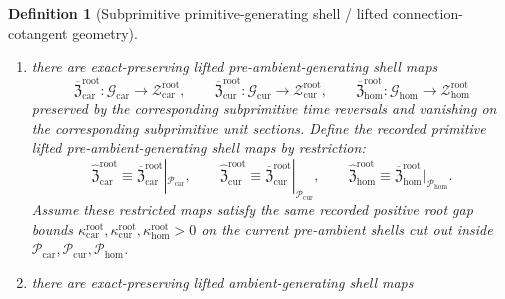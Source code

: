 \documentclass[11pt]{article}
\newcommand{\TensorRootTarget}{\mathcal Z_{\mathrm{car}}^{\mathrm{root}}}
\newcommand{\CurRootTarget}{\mathcal Z_{\mathrm{cur}}^{\mathrm{root}}}
\newcommand{\HomRootTarget}{\mathcal Z_{\mathrm{hom}}^{\mathrm{root}}}
\newcommand{\TensorRootGap}{\kappa_{\mathrm{car}}^{\mathrm{root}}}
\newcommand{\CurRootGap}{\kappa_{\mathrm{cur}}^{\mathrm{root}}}
\newcommand{\HomRootGap}{\kappa_{\mathrm{hom}}^{\mathrm{root}}}
\newcommand{\TensorPrimitiveSpace}{\mathcal P_{\mathrm{car}}}
\newcommand{\CurPrimitiveSpace}{\mathcal P_{\mathrm{cur}}}
\newcommand{\HomPrimitiveSpace}{\mathcal P_{\mathrm{hom}}}
\newcommand{\TensorPrimitiveTarget}{\mathcal W_{\mathrm{car}}^{\mathrm{prim}}}
\newcommand{\CurPrimitiveTarget}{\mathcal W_{\mathrm{cur}}^{\mathrm{prim}}}
\newcommand{\HomPrimitiveTarget}{\mathcal W_{\mathrm{hom}}^{\mathrm{prim}}}
\newcommand{\TensorPrimitiveSection}{\mathfrak P_{\mathrm{car}}^{\mathrm{prim}}}
\newcommand{\CurPrimitiveSection}{\mathfrak P_{\mathrm{cur}}^{\mathrm{prim}}}
\newcommand{\HomPrimitiveSection}{\mathfrak P_{\mathrm{hom}}^{\mathrm{prim}}}
\newcommand{\TensorPrimitiveGap}{\lambda_{\mathrm{car}}^{\mathrm{prim}}}
\newcommand{\CurPrimitiveGap}{\lambda_{\mathrm{cur}}^{\mathrm{prim}}}
\newcommand{\HomPrimitiveGap}{\lambda_{\mathrm{hom}}^{\mathrm{prim}}}
\newcommand{\TensorPrimitiveLiftedPreAmbientSection}{\widehat{\mathfrak Z}_{\mathrm{car}}^{\mathrm{root}}}
\newcommand{\CurPrimitiveLiftedPreAmbientSection}{\widehat{\mathfrak Z}_{\mathrm{cur}}^{\mathrm{root}}}
\newcommand{\HomPrimitiveLiftedPreAmbientSection}{\widehat{\mathfrak Z}_{\mathrm{hom}}^{\mathrm{root}}}
\newcommand{\TensorSubprimitiveSpace}{\mathcal G_{\mathrm{car}}}
\newcommand{\CurSubprimitiveSpace}{\mathcal G_{\mathrm{cur}}}
\newcommand{\HomSubprimitiveSpace}{\mathcal G_{\mathrm{hom}}}
\newcommand{\TensorSubprimitiveLiftedRootSection}{\overline{\mathfrak P}_{\mathrm{car}}^{\mathrm{prim}}}
\newcommand{\CurSubprimitiveLiftedRootSection}{\overline{\mathfrak P}_{\mathrm{cur}}^{\mathrm{prim}}}
\newcommand{\HomSubprimitiveLiftedRootSection}{\overline{\mathfrak P}_{\mathrm{hom}}^{\mathrm{prim}}}
\newcommand{\TensorSubprimitiveLiftedPreAmbientSection}{\overline{\mathfrak Z}_{\mathrm{car}}^{\mathrm{root}}}
\newcommand{\CurSubprimitiveLiftedPreAmbientSection}{\overline{\mathfrak Z}_{\mathrm{cur}}^{\mathrm{root}}}
\newcommand{\HomSubprimitiveLiftedPreAmbientSection}{\overline{\mathfrak Z}_{\mathrm{hom}}^{\mathrm{root}}}
\newtheorem{definition}{Definition}
\begin{document}
\begin{definition}[Subprimitive primitive-generating shell / lifted connection-cotangent geometry]
\begin{enumerate}
    \[
    \TensorSubprimitiveLiftedRootSection:\TensorSubprimitiveSpace\to\TensorPrimitiveTarget,\qquad
    \CurSubprimitiveLiftedRootSection:\CurSubprimitiveSpace\to\CurPrimitiveTarget,\qquad
    \HomSubprimitiveLiftedRootSection:\HomSubprimitiveSpace\to\HomPrimitiveTarget
    \]
    preserved by the corresponding subprimitive time reversals and vanishing on the corresponding subprimitive unit sections. Define the recorded primitive root-generating shell sections by restriction:
    \begin{equation}
    \TensorPrimitiveSection\equiv\TensorSubprimitiveLiftedRootSection|_{\TensorPrimitiveSpace},\qquad
    \CurPrimitiveSection\equiv\CurSubprimitiveLiftedRootSection|_{\CurPrimitiveSpace},\qquad
    \HomPrimitiveSection\equiv\HomSubprimitiveLiftedRootSection|_{\HomPrimitiveSpace}.
    \label{eq:primitive_root_section_from_subprimitive}
    \end{equation}
    Assume these restricted sections satisfy the same recorded positive primitive gap bounds \(\TensorPrimitiveGap,\CurPrimitiveGap,\HomPrimitiveGap>0\) on the current root shells cut out inside \(\TensorPrimitiveSpace,\CurPrimitiveSpace,\HomPrimitiveSpace\).
    \item there are exact-preserving lifted pre-ambient-generating shell maps
    \[
    \TensorSubprimitiveLiftedPreAmbientSection:\TensorSubprimitiveSpace\to\TensorRootTarget,\qquad
    \CurSubprimitiveLiftedPreAmbientSection:\CurSubprimitiveSpace\to\CurRootTarget,\qquad
    \HomSubprimitiveLiftedPreAmbientSection:\HomSubprimitiveSpace\to\HomRootTarget
    \]
    preserved by the corresponding subprimitive time reversals and vanishing on the corresponding subprimitive unit sections. Define the recorded primitive lifted pre-ambient-generating shell maps by restriction:
    \begin{equation}
    \TensorPrimitiveLiftedPreAmbientSection\equiv\TensorSubprimitiveLiftedPreAmbientSection|_{\TensorPrimitiveSpace},\qquad
    \CurPrimitiveLiftedPreAmbientSection\equiv\CurSubprimitiveLiftedPreAmbientSection|_{\CurPrimitiveSpace},\qquad
    \HomPrimitiveLiftedPreAmbientSection\equiv\HomSubprimitiveLiftedPreAmbientSection|_{\HomPrimitiveSpace}.
    \label{eq:primitive_preambient_from_subprimitive}
    \end{equation}
    Assume these restricted maps satisfy the same recorded positive root gap bounds \(\TensorRootGap,\CurRootGap,\HomRootGap>0\) on the current pre-ambient shells cut out inside \(\TensorPrimitiveSpace,\CurPrimitiveSpace,\HomPrimitiveSpace\).
    \item there are exact-preserving lifted ambient-generating shell maps

\end{enumerate}
\end{definition}
\end{document}

